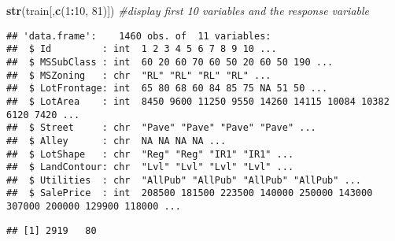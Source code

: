 \documentclass[]{article}
\newenvironment{Shaded}{\begin{snugshade}}{\end{snugshade}}
\newcommand{\CommentTok}[1]{\textcolor[rgb]{0.56,0.35,0.01}{\textit{#1}}}
\newcommand{\DecValTok}[1]{\textcolor[rgb]{0.00,0.00,0.81}{#1}}
\newcommand{\KeywordTok}[1]{\textcolor[rgb]{0.13,0.29,0.53}{\textbf{#1}}}
\newcommand{\NormalTok}[1]{#1}
\newcommand{\OperatorTok}[1]{\textcolor[rgb]{0.81,0.36,0.00}{\textbf{#1}}}
\newcommand{\OtherTok}[1]{\textcolor[rgb]{0.56,0.35,0.01}{#1}}
\newcommand{\StringTok}[1]{\textcolor[rgb]{0.31,0.60,0.02}{#1}}
\begin{document}
\begin{Shaded}
\begin{Highlighting}[]
\KeywordTok{str}\NormalTok{(train[,}\KeywordTok{c}\NormalTok{(}\DecValTok{1}\OperatorTok{:}\DecValTok{10}\NormalTok{, }\DecValTok{81}\NormalTok{)]) }\CommentTok{#display first 10 variables and the response variable}
\end{Highlighting}
\end{Shaded}

\begin{verbatim}
## 'data.frame':    1460 obs. of  11 variables:
##  $ Id         : int  1 2 3 4 5 6 7 8 9 10 ...
##  $ MSSubClass : int  60 20 60 70 60 50 20 60 50 190 ...
##  $ MSZoning   : chr  "RL" "RL" "RL" "RL" ...
##  $ LotFrontage: int  65 80 68 60 84 85 75 NA 51 50 ...
##  $ LotArea    : int  8450 9600 11250 9550 14260 14115 10084 10382 6120 7420 ...
##  $ Street     : chr  "Pave" "Pave" "Pave" "Pave" ...
##  $ Alley      : chr  NA NA NA NA ...
##  $ LotShape   : chr  "Reg" "Reg" "IR1" "IR1" ...
##  $ LandContour: chr  "Lvl" "Lvl" "Lvl" "Lvl" ...
##  $ Utilities  : chr  "AllPub" "AllPub" "AllPub" "AllPub" ...
##  $ SalePrice  : int  208500 181500 223500 140000 250000 143000 307000 200000 129900 118000 ...
\end{verbatim}

\begin{Shaded}
\end{Shaded}

\begin{Shaded}
\end{Shaded}

\begin{verbatim}
## [1] 2919   80
\end{verbatim}
\end{document}

